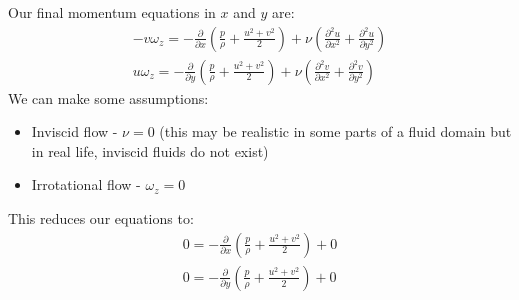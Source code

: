 Our final momentum equations in $x$ and $y$ are:
\begin{gather}
  -v \omega_z = - \frac{\partial}{\partial x} \left( \frac{p}{\rho} + \frac{u^2 + v^2}{2} \right) + \nu \left( \frac{\partial^2 u}{\partial x^2} + \frac{\partial^2 u}{\partial y^2} \right)\\
  u \omega_z = - \frac{\partial}{\partial y} \left( \frac{p}{\rho} + \frac{u^2 + v^2}{2} \right) + \nu \left( \frac{\partial^2 v}{\partial x^2} + \frac{\partial^2 v}{\partial y^2} \right)
\end{gather}
We can make some assumptions:
\begin{itemize}
  \item Inviscid flow - $\nu = 0$ (this may be realistic in some parts of a fluid domain but in real life, inviscid fluids do not exist)
  \item Irrotational flow - $\omega_z = 0$
\end{itemize}
This reduces our equations to:
\begin{gather}
  0 = - \frac{\partial}{\partial x} \left( \frac{p}{\rho} + \frac{u^2 + v^2}{2} \right) + 0\\
  0 = - \frac{\partial}{\partial y} \left( \frac{p}{\rho} + \frac{u^2 + v^2}{2} \right) + 0
\end{gather}
